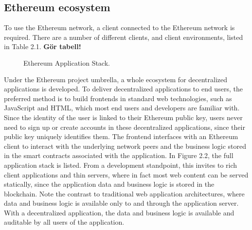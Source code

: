\subsection{Ethereum ecosystem}
To use the Ethereum network, a client connected to the Ethereum network is required. There are a number of different clients, and client environments, listed in Table 2.1. \textbf{Gör tabell!}

\begin{figure}[ht]
\centering
{}
\caption{Ethereum Application Stack.}
\end{figure}

Under the Ethereum project umbrella, a whole ecosystem for decentralized applications is developed. To deliver decentralized applications to end users, the preferred method is to build frontends in standard web technologies, such as JavaScript and HTML, which most end users and developers are familiar with. Since the identity of the user is linked to their Ethereum public key, users never need to sign up or create accounts in these decentralized applications, since their public key uniquely identifies them. The frontend interfaces with an Ethereum client to interact with the underlying network peers and the business logic stored in the smart contracts associated with the application. In Figure 2.2, the full application stack is listed.
From a development standpoint, this invites to rich client applications and thin servers, where in fact most web content can be served statically, since the application data and business logic is stored in the blockchain. Note the contrast to traditional web application architectures, where data and business logic is available only to and through the application server. With a decentralized application, the data and business logic is available and auditable by all users of the application.

